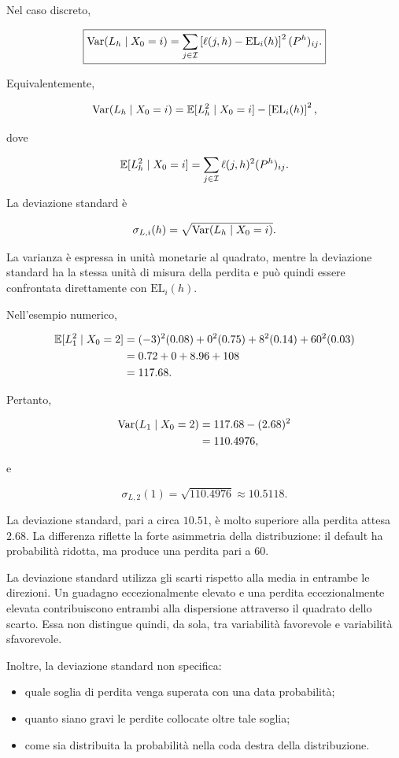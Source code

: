 Nel caso discreto,

\[
\boxed{
\operatorname{Var}(L_h\mid X_0=i)
=
\sum_{j\in\mathcal{I}}
\left[
\ell(j,h)-\mathrm{EL}_i(h)
\right]^2
(P^h)_{ij}.
}
\]

Equivalentemente,

\[
\operatorname{Var}(L_h\mid X_0=i)
=
\mathbb{E}[L_h^2\mid X_0=i]
-
\left[\mathrm{EL}_i(h)\right]^2,
\]

dove

\[
\mathbb{E}[L_h^2\mid X_0=i]
=
\sum_{j\in\mathcal{I}}
\ell(j,h)^2(P^h)_{ij}.
\]

La deviazione standard \`{e}

\[
\sigma_{L,i}(h)
=
\sqrt{
\operatorname{Var}(L_h\mid X_0=i)
}.
\]

La varianza \`{e} espressa in unit\`{a} monetarie al quadrato, mentre
la deviazione standard ha la stessa unit\`{a} di misura della perdita e
pu\`{o} quindi essere confrontata direttamente con
$\mathrm{EL}_i(h)$.

Nell'esempio numerico,

\[
\begin{split}
\mathbb{E}[L_1^2\mid X_0=2]
&=
(-3)^2(0.08)
+
0^2(0.75)
+
8^2(0.14)
+
60^2(0.03)
\\
&=
0.72+0+8.96+108
\\
&=
117.68.
\end{split}
\]

Pertanto,

\[
\begin{split}
\operatorname{Var}(L_1\mid X_0=2)
&=
117.68-(2.68)^2
\\
&=
110.4976,
\end{split}
\]

e

\[
\sigma_{L,2}(1)
=
\sqrt{110.4976}
\approx
10.5118.
\]

La deviazione standard, pari a circa $10.51$, \`{e} molto superiore
alla perdita attesa $2.68$. La differenza riflette la forte
asimmetria della distribuzione: il default ha probabilit\`{a} ridotta,
ma produce una perdita pari a $60$.

La deviazione standard utilizza gli scarti rispetto alla media in
entrambe le direzioni. Un guadagno eccezionalmente elevato e una perdita
eccezionalmente elevata contribuiscono entrambi alla dispersione
attraverso il quadrato dello scarto. Essa non distingue quindi, da sola,
tra variabilit\`{a} favorevole e variabilit\`{a} sfavorevole.

Inoltre, la deviazione standard non specifica:

\begin{itemize}

\item quale soglia di perdita venga superata con una data
probabilit\`{a};

\item quanto siano gravi le perdite collocate oltre tale soglia;

\item come sia distribuita la probabilit\`{a} nella coda destra della
distribuzione.

\end{itemize}

